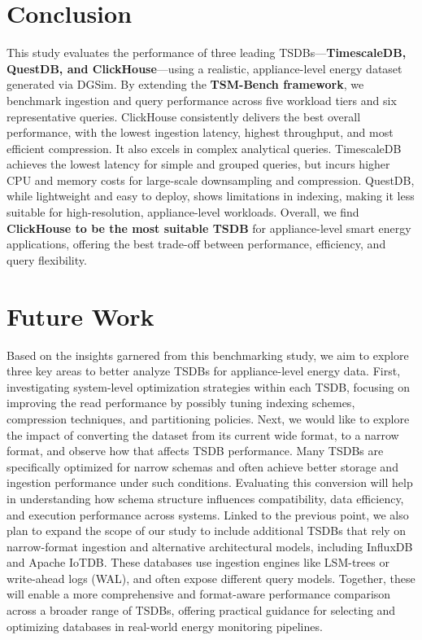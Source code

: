 \documentclass[conference]{IEEEtran}
\begin{document}
\section{Conclusion}\label{sec:conclusion}
This study evaluates the performance of three leading TSDBs—\textbf{TimescaleDB, QuestDB, and ClickHouse}—using a realistic, appliance-level energy dataset generated via DGSim. By extending the \textbf{TSM-Bench framework}, we benchmark ingestion and query performance across five workload tiers and six representative queries. ClickHouse consistently delivers the best overall performance, with the lowest ingestion latency, highest throughput, and most efficient compression. It also excels in complex analytical queries. TimescaleDB achieves the lowest latency for simple and grouped queries, but incurs higher CPU and memory costs for large-scale downsampling and compression. QuestDB, while lightweight and easy to deploy, shows limitations in indexing, making it less suitable for high-resolution, appliance-level workloads. Overall, we find \textbf{ClickHouse to be the most suitable TSDB} for appliance-level smart energy applications, offering the best trade-off between performance, efficiency, and query flexibility.

\section{Future Work}\label{sec:future}
Based on the insights garnered from this benchmarking study, we aim to explore three key areas to better analyze TSDBs for appliance-level energy data. 
First, investigating system-level optimization strategies within each TSDB, focusing on improving the read performance by possibly tuning indexing schemes, compression techniques, and partitioning policies. 
Next, we would like to explore the impact of converting the dataset from its current wide format, to a narrow format, and observe how that affects TSDB performance. Many TSDBs are specifically optimized for narrow schemas and often achieve better storage and ingestion performance under such conditions. Evaluating this conversion will help in understanding how schema structure influences compatibility, data efficiency, and execution performance across systems.
Linked to the previous point, we also plan to expand the scope of our study to include additional TSDBs that rely on narrow-format ingestion and alternative architectural models, including InfluxDB and Apache IoTDB\@. These databases use ingestion engines like LSM-trees or write-ahead logs (WAL), and often expose different query models. Together, these will enable a more comprehensive and format-aware performance comparison across a broader range of TSDBs, offering practical guidance for selecting and optimizing databases in real-world energy monitoring pipelines.
\end{document}
